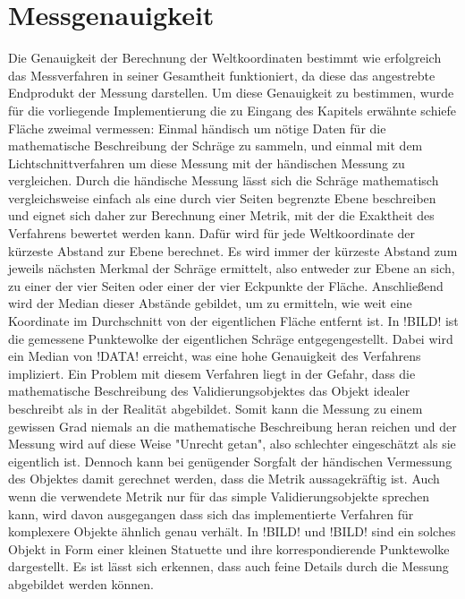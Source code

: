 \section{Messgenauigkeit}
Die Genauigkeit der Berechnung der Weltkoordinaten bestimmt wie erfolgreich das Messverfahren in seiner Gesamtheit funktioniert, da diese das angestrebte Endprodukt der Messung darstellen. Um diese Genauigkeit zu bestimmen, wurde für die vorliegende Implementierung die zu Eingang des Kapitels erwähnte schiefe Fläche zweimal vermessen: Einmal händisch um nötige Daten für die mathematische Beschreibung der Schräge zu sammeln, und einmal mit dem Lichtschnittverfahren um diese Messung mit der händischen Messung zu vergleichen. Durch die händische Messung lässt sich die Schräge mathematisch vergleichsweise einfach als eine durch vier Seiten begrenzte Ebene beschreiben und eignet sich daher zur Berechnung einer Metrik, mit der die Exaktheit des Verfahrens bewertet werden kann. Dafür wird für jede Weltkoordinate der kürzeste Abstand zur Ebene berechnet. Es wird immer der kürzeste Abstand zum jeweils nächsten Merkmal der Schräge ermittelt, also entweder zur Ebene an sich, zu einer der vier Seiten oder einer der vier Eckpunkte der Fläche. Anschließend wird der Median dieser Abstände gebildet, um zu ermitteln, wie weit eine Koordinate im Durchschnitt von der eigentlichen Fläche entfernt ist. In !BILD! ist die gemessene Punktewolke der eigentlichen Schräge entgegengestellt. Dabei wird ein Median von !DATA! erreicht, was eine hohe Genauigkeit des Verfahrens impliziert. \bigbreak
Ein Problem mit diesem Verfahren liegt in der Gefahr, dass die mathematische Beschreibung des Validierungsobjektes das Objekt idealer beschreibt als in der Realität abgebildet. Somit kann die Messung zu einem gewissen Grad niemals an die mathematische Beschreibung heran reichen und der Messung wird auf diese Weise "Unrecht getan", also schlechter eingeschätzt als sie eigentlich ist. Dennoch kann bei genügender Sorgfalt der händischen Vermessung des Objektes damit gerechnet werden, dass die Metrik aussagekräftig ist. Auch wenn die verwendete Metrik nur für das simple Validierungsobjekte sprechen kann, wird davon ausgegangen dass sich das implementierte Verfahren für komplexere Objekte ähnlich genau verhält. In !BILD! und !BILD! sind ein solches Objekt in Form einer kleinen Statuette und ihre korrespondierende Punktewolke dargestellt. Es ist lässt sich erkennen, dass auch feine Details durch die Messung abgebildet werden können.